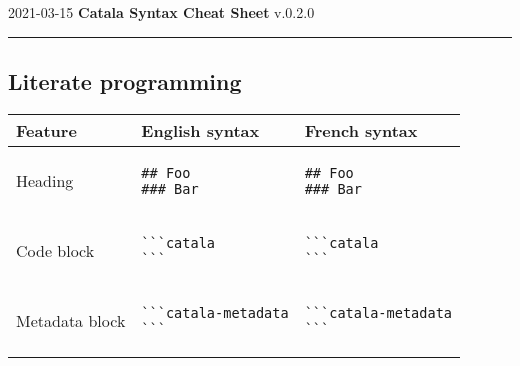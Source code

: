 \documentclass[a3paper,landscape]{article}
\begin{document}
\begin{center}
  2021-03-15
  \hfill
  {\Huge\bfseries\sffamily
    Catala Syntax Cheat Sheet}
  \hfill
  v.0.2.0
\end{center}
\hrule

\begin{multicols*}{2}

  \section*{Literate programming}
  \begin{center}
    \begin{tabular}{p{}p{}p{}}
      \toprule
      Feature        & English syntax & French syntax \\\midrule
      Heading        &
      \vspace*{-1.75em}
      \begin{verbatim}
## Foo
### Bar
\end{verbatim}
      \vspace*{-1.75em}
                     &
      \vspace*{-1.75em}
      \begin{verbatim}
## Foo
### Bar
\end{verbatim}
      \vspace*{-1.75em}
      \\
      Code block     &
      \vspace*{-1.75em}
      \begin{verbatim}
```catala
```
\end{verbatim}
      \vspace*{-1.75em}
                     &
      \vspace*{-1.75em}
      \begin{verbatim}
```catala
```
\end{verbatim}
      \vspace*{-1.75em}
      \\
      Metadata block &
      \vspace*{-1.75em}
      \begin{verbatim}
```catala-metadata
```
\end{verbatim}
      \vspace*{-1.75em}
                     &
      \vspace*{-1.75em}
      \begin{verbatim}
```catala-metadata
```
\end{verbatim}

\end{tabular}
\end{center}
\end{multicols*}
\end{document}
